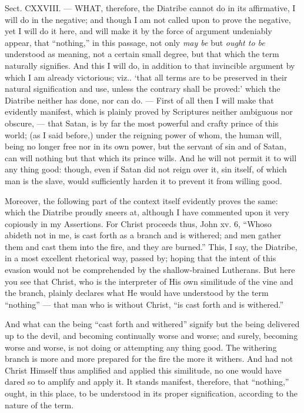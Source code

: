 
Sect. CXXVIII. — WHAT, therefore, the Diatribe cannot do in its affirmative, I will do in the negative; and though I am not called upon to prove the negative, yet I will do it here, and will make it by the force of argument undeniably appear, that “nothing,” in this passage, not only \emph{may be }but \emph{ought to be }understood as meaning, not a certain small degree, but that which the term naturally signifies. And this I will do, in addition to that invincible argument by which I am already victorious; viz.. ‘that all terms are to be preserved in their natural signification and use, unless the contrary shall be proved:’ which the Diatribe neither has done, nor can do. — First of all then I will make that evidently manifest, which is plainly proved by Scriptures neither ambiguous nor obscure, — that Satan, is by far the most powerful and crafty prince of this world; (as I said before,) under the reigning power of whom, the human will, being no longer free nor in its own power, but the servant of sin and of Satan, can will nothing but that which its prince wills. And he will not permit it to will any thing good: though, even if Satan did not reign over it, sin itself, of which man is the slave, would sufficiently harden it to prevent it from willing good.

Moreover, the following part of the context itself evidently proves the same: which the Diatribe proudly sneers at, although I have commented upon it very copiously in my Assertions. For Christ proceeds thus, John xv. 6, “Whoso abideth not in me, is cast forth as a branch and is withered; and men gather them and cast them into the fire, and they are burned.” This, I say, the Diatribe, in a most excellent rhetorical way, passed by; hoping that the intent of this evasion would not be comprehended by the shallow-brained Lutherans. But here you see that Christ, who is the interpreter of His own similitude of the vine and the branch, plainly declares what He would have understood by the term “nothing” — that man who is without Christ, “is cast forth and is withered.”

And what can the being “cast forth and withered” signify but the being delivered up to the devil, and becoming continually worse and worse; and surely, becoming worse and worse, is not doing or attempting any thing good. The withering branch is more and more prepared for the fire the more it withers. And had not Christ Himself thus amplified and applied this similitude, no one would have dared so to amplify and apply it. It stands manifest, therefore, that “nothing,” ought, in this place, to be understood in its proper signification, according to the nature of the term.

